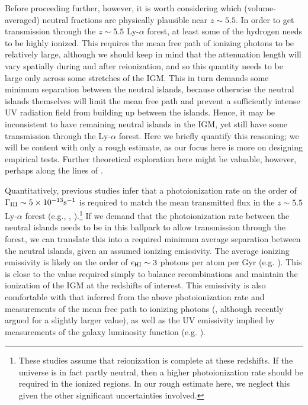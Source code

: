  Before proceeding further, however, it is worth considering which (volume-averaged) neutral fractions are physically plausible near $z \sim 5.5$. In order to get transmission through
 the $z \sim 5.5$ Ly-$\alpha$ forest, at least some of the hydrogen needs to be highly ionized.  This requires the mean free path of ionizing photons to be relatively large, although we should keep in mind that the attenuation length will vary spatially during and after reionization, and so this quantity needs to be large only across some stretches of the IGM.
 This in turn demands some minimum separation between the neutral islands, because otherwise the neutral islands themselves will limit the mean free path and prevent a sufficiently
 intense UV radiation field from building up between the islands. Hence, it may be inconsistent to have remaining neutral islands in the IGM, yet still have some transmission through the Ly-$\alpha$ forest. Here we briefly quantify this reasoning; we will be content with only a rough estimate, as our focus
here is more on designing empirical tests. Further theoretical
exploration here might be valuable, however, perhaps along the lines of \citet{Xu:2013npa}. 

Quantitatively, previous studies infer that a photoionization rate on the order of $\Gamma_{\rm HI} \sim 5 \times 10^{-13} \text{s}^{-1}$ is required to match the mean transmitted flux in the
$z \sim 5.5$ Ly-$\alpha$ forest (e.g., \citealt{KuhlenConcordance}, \citealt{Bolton:2007b}).\footnote{These studies assume that reionization is complete at these redshifts. If the universe is in fact partly neutral, then a higher photoionization rate should be required in the ionized regions. In our rough estimate here, we neglect this given the other significant uncertainties involved.}
If we demand that the photoionization rate between the neutral islands needs to be in this ballpark to allow transmission through the forest, we can translate this into a required minimum average separation
between the neutral islands, given an assumed ionizing emissivity. The average ionizing emissivity is likely on the order of $\epsilon_{\rm HI} \sim 3$ photons per atom per Gyr (e.g. \citealt{Bolton:2007b}).
This is close to the value required simply to balance recombinations and maintain the ionization of the IGM at the redshifts of interest. This emissivity is also comfortable with that inferred from the above
photoionization rate and measurements of the mean free path to ionizing photons (\citealt{Bolton:2007b}, although \citealt{Becker:2013ffa} recently argued for a slightly larger value), as well as the UV emissivity implied by measurements of the galaxy luminosity function (e.g. \citealt{Robertson:2013bq}).
  

